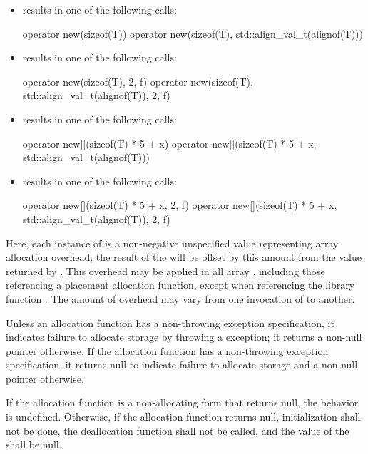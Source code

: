 \pnum
\begin{example}
\begin{itemize}
\item {} results in one of the following calls:
\begin{codeblock}
operator new(sizeof(T))
operator new(sizeof(T), std::align_val_t(alignof(T)))
\end{codeblock}
\item {} results in one of the following calls:
\begin{codeblock}
operator new(sizeof(T), 2, f)
operator new(sizeof(T), std::align_val_t(alignof(T)), 2, f)
\end{codeblock}
\item {} results in one of the following calls:
\begin{codeblock}
operator new[](sizeof(T) * 5 + x)
operator new[](sizeof(T) * 5 + x, std::align_val_t(alignof(T)))
\end{codeblock}
\item {} results in one of the following calls:
\begin{codeblock}
operator new[](sizeof(T) * 5 + x, 2, f)
operator new[](sizeof(T) * 5 + x, std::align_val_t(alignof(T)), 2, f)
\end{codeblock}
\end{itemize}
Here, each instance of  is a non-negative unspecified value
representing array allocation overhead; the result of the
 will be offset by this amount from the value
returned by . This overhead may be applied in all
array , including those referencing
a placement allocation function, except when referencing
the library function .
The amount of overhead may vary from one
invocation of  to another.
\end{example}

\pnum
\begin{note}
Unless an allocation function has a non-throwing
exception specification,
it indicates failure to allocate storage by throwing a
%
%
exception;
it returns a non-null pointer otherwise. If the allocation function
has a non-throwing exception specification,
it returns null to indicate failure to allocate storage
and a non-null pointer otherwise.
\end{note}
If the allocation function is a non-allocating
form that returns null,
the behavior is undefined.
Otherwise,
if the allocation function returns null, initialization shall not be
done, the deallocation function shall not be called, and the value of
the  shall be null.

